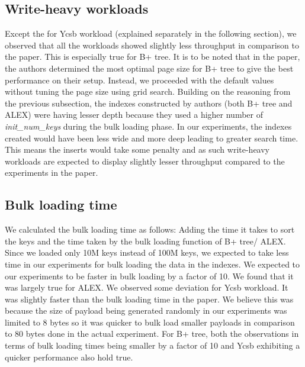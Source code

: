\documentclass[12pt,a4paper]{article}
\begin{document}
\subsection{Write-heavy workloads}
Except the for Ycsb workload (explained separately in the following section), we observed that all the workloads showed slightly less throughput in comparison to the paper. This is especially true for B+ tree. It is to be noted that in the paper, the authors determined the most optimal page size for B+ tree to give the best performance on their setup. Instead, we proceeded with the default values without tuning the page size using grid search. Building on the reasoning from the previous subsection, the indexes constructed by authors (both B+ tree and ALEX) were having lesser depth because they used a higher number of \emph{init\_num\_keys} during the bulk loading phase. In our experiments, the indexes created would have been less wide and more deep leading to greater search time. This means the inserts would take some penalty and as such write-heavy workloads are expected to display slightly lesser throughput compared to the experiments in the paper.


\subsection{Bulk loading time}
We calculated the bulk loading time as follows: Adding the time it takes to sort the keys and the time taken by the bulk loading function of B+ tree/ ALEX. Since we loaded only 10M keys instead of 100M keys, we expected to take less time in our experiments for bulk loading the data in the indexes. We expected to our experiments to be faster in bulk loading by a factor of 10. We found that it was largely true for ALEX. We observed some deviation for Ycsb workload. It was slightly faster than the bulk loading time in the paper. We believe this was because the size of payload being generated randomly in our experiments was limited to 8 bytes so it was quicker to bulk load smaller payloads in comparison to 80 bytes done in the actual experiment. For B+ tree, both the observations in terms of bulk loading times being smaller by a factor of 10 and Ycsb exhibiting a quicker performance also hold true.
\end{document}
